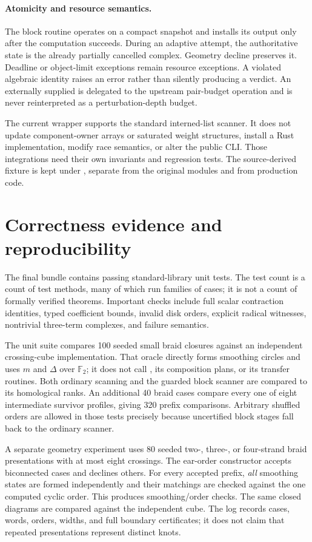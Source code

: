 \documentclass[11pt]{article}
\theoremstyle{definition}\newtheorem{definition}[theorem]{Definition}
\theoremstyle{remark}\newtheorem{remark}[theorem]{Remark}
\newcommand{\F}{{\mathbb F_2}}
\newcommand{\code}[1]{\texttt{\detokenize{#1}}}
\begin{document}
\paragraph{Atomicity and resource semantics.}
The block routine operates on a compact snapshot and installs its output only
after the computation succeeds. During an adaptive attempt, the authoritative
state is the already partially cancelled complex. Geometry decline preserves
it. Deadline or object-limit exceptions remain resource exceptions. A violated
algebraic identity raises an error rather than silently producing a verdict.
An externally supplied \code{update_budget} is delegated to the upstream
pair-budget operation and is never reinterpreted as a perturbation-depth budget.

The current wrapper supports the standard interned-list scanner. It does not
update component-owner arrays or saturated weight structures, install a Rust
implementation, modify race semantics, or alter the public CLI. Those integrations
need their own invariants and regression tests. The source-derived fixture is
kept under \code{reference_upstream}, separate from the original modules and from
production code.

\section{Correctness evidence and reproducibility}
\label{sec:validation}
The final bundle contains \UnitTests{} passing standard-library unit tests. The
test count is a count of test methods, many of which run families of cases; it is
not a count of formally verified theorems. Important checks include full scalar
contraction identities, typed coefficient bounds, invalid disk orders, explicit
radical witnesses, nontrivial three-term complexes, and failure semantics.

The unit suite compares 100 seeded small braid closures against an independent
crossing-cube implementation. That oracle directly forms smoothing circles and
uses $m$ and $\Delta$ over $\F$; it does not call \code{Planar}, its composition
plans, or its transfer routines. Both ordinary scanning and the guarded block
scanner are compared to its homological ranks. An additional 40 braid cases
compare every one of eight intermediate survivor profiles, giving 320 prefix
comparisons. Arbitrary shuffled orders are allowed in those tests precisely
because uncertified block stages fall back to the ordinary scanner.

A separate geometry experiment uses 80 seeded two-, three-, or four-strand braid
presentations with at most eight crossings. The ear-order constructor accepts
\GeometryAccepted{} biconnected cases and declines \GeometryDeclined{} others.
For every accepted prefix, \emph{all} smoothing states are formed independently
and their matchings are checked against the one computed cyclic order. This
produces \SmoothingChecks{} smoothing/order checks. The same
\GeometryAccepted{} closed diagrams are compared against the independent cube.
The log records cases, words, orders, widths, and full boundary certificates;
it does not claim that repeated presentations represent distinct knots.
\end{document}
